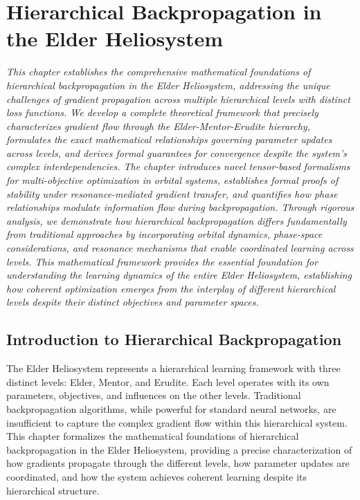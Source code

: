 \chapter{Hierarchical Backpropagation in the Elder Heliosystem}

\textit{This chapter establishes the comprehensive mathematical foundations of hierarchical backpropagation in the Elder Heliosystem, addressing the unique challenges of gradient propagation across multiple hierarchical levels with distinct loss functions. We develop a complete theoretical framework that precisely characterizes gradient flow through the Elder-Mentor-Erudite hierarchy, formulates the exact mathematical relationships governing parameter updates across levels, and derives formal guarantees for convergence despite the system's complex interdependencies. The chapter introduces novel tensor-based formalisms for multi-objective optimization in orbital systems, establishes formal proofs of stability under resonance-mediated gradient transfer, and quantifies how phase relationships modulate information flow during backpropagation. Through rigorous analysis, we demonstrate how hierarchical backpropagation differs fundamentally from traditional approaches by incorporating orbital dynamics, phase-space considerations, and resonance mechanisms that enable coordinated learning across levels. This mathematical framework provides the essential foundation for understanding the learning dynamics of the entire Elder Heliosystem, establishing how coherent optimization emerges from the interplay of different hierarchical levels despite their distinct objectives and parameter spaces.}

\section{Introduction to Hierarchical Backpropagation}

The Elder Heliosystem represents a hierarchical learning framework with three distinct levels: Elder, Mentor, and Erudite. Each level operates with its own parameters, objectives, and influences on the other levels. Traditional backpropagation algorithms, while powerful for standard neural networks, are insufficient to capture the complex gradient flow within this hierarchical system. This chapter formalizes the mathematical foundations of hierarchical backpropagation in the Elder Heliosystem, providing a precise characterization of how gradients propagate through the different levels, how parameter updates are coordinated, and how the system achieves coherent learning despite its hierarchical structure.

